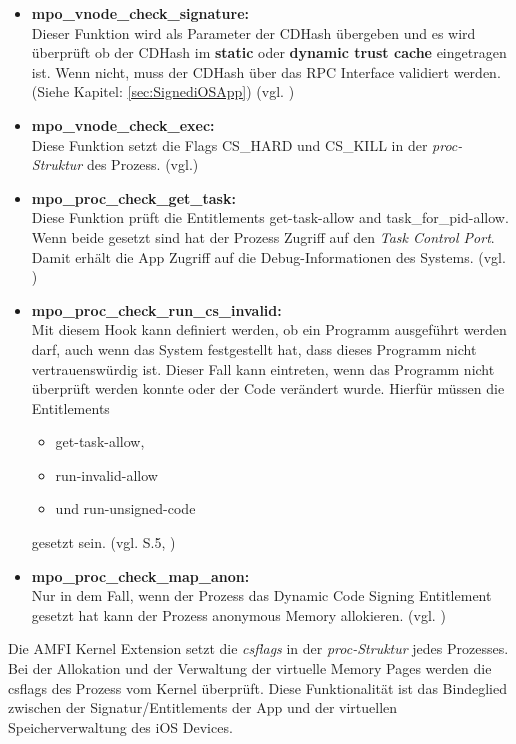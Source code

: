\begin{itemize}
    \item \label{item:AMFIfunc} \textbf{mpo\_vnode\_check\_signature:} \\
    Dieser Funktion wird als Parameter der CDHash übergeben und es wird überprüft ob der CDHash im \textbf{static} oder \textbf{dynamic trust cache} eingetragen ist. Wenn nicht, muss der CDHash über das RPC Interface validiert werden. (Siehe Kapitel: \ref{sec:SignediOSApp}) (vgl. \cite{iOSSec[5], Hacking[1]})
    \item \textbf{mpo\_vnode\_check\_exec:}\\
    Diese Funktion setzt die Flags CS\_HARD und CS\_KILL in der \textit{\glqq proc-Struktur\grqq{}} des Prozess. (vgl.\cite{iOSSec[5],  Hacking[1]})
    \item \textbf{mpo\_proc\_check\_get\_task:}\\
    Diese Funktion prüft die Entitlements get-task-allow and task\_for\_pid-allow. Wenn beide gesetzt sind hat der Prozess Zugriff auf den \textit{\glqq Task Control Port\grqq{}}. Damit erhält  die App Zugriff auf die Debug-Informationen des Systems. (vgl. \cite{iOSSec[5],  Hacking[1]})
    
    \item \textbf{mpo\_proc\_check\_run\_cs\_invalid:} \\
    Mit diesem Hook kann definiert werden, ob ein Programm ausgeführt werden darf, auch wenn das System festgestellt hat, dass dieses Programm nicht vertrauenswürdig ist. Dieser Fall kann eintreten, wenn das Programm nicht überprüft werden konnte oder der Code verändert wurde. Hierfür müssen die Entitlements 
    \begin{itemize}
        \item get-task-allow, 
        \item run-invalid-allow 
        \item und run-unsigned-code 
     \end{itemize} 
     gesetzt sein. (vgl. \cite{iOSSec[5]} S.5, \cite{Hacking[1]})
    
    \item \textbf{mpo\_proc\_check\_map\_anon:}\\
    Nur in dem Fall, wenn der Prozess das Dynamic Code Signing Entitlement gesetzt hat kann der Prozess anonymous Memory allokieren. (vgl. \cite{iOSSec[5],  Hacking[1]})
\end{itemize}

Die AMFI Kernel Extension setzt die \textit{\glqq csflags\grqq{}} in der \textit{\glqq proc-Struktur\grqq{}} jedes Prozesses. Bei der Allokation und der Verwaltung der virtuelle Memory Pages werden die csflags des Prozess  vom Kernel überprüft. Diese Funktionalität ist das Bindeglied zwischen der Signatur/Entitlements der App und der virtuellen Speicherverwaltung des iOS Devices. 

